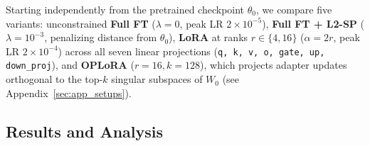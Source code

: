\documentclass{article}
\begin{document}
Starting independently from the pretrained checkpoint $\theta_0$, we compare five variants: unconstrained \textbf{Full FT} ($\lambda=0$, peak LR $2\times 10^{-5}$), \textbf{Full FT + L2-SP} ($\lambda=10^{-3}$, penalizing distance from $\theta_0$), \textbf{LoRA} at ranks $r \in \{4, 16\}$ ($\alpha=2r$, peak LR $2\times 10^{-4}$) across all seven linear projections (\texttt{q, k, v, o, gate, up, down\_proj}), and \textbf{OPLoRA} ($r=16, k=128$), which projects adapter updates orthogonal to the top-$k$ singular subspaces of $W_0$ (see Appendix~\ref{sec:app_setups}).

\subsection{Results and Analysis}
\label{sec:task1_results}
\end{document}
